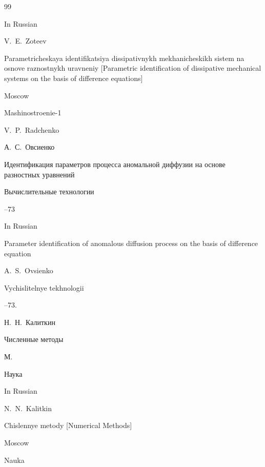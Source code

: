 \begin{thebibliography}{99}

\misctransl

\lang In Russian

\by V.~E.~Zoteev

\book Parametricheskaya identifikatsiya dissipativnykh mekhani\-cheskikh sistem na osnove raznostnykh uravneniy \rm [Parametric identification of dissipative mechanical systems on the basis of difference equations]

\publaddr Moscow

\publ Mashinostroenie-1


\ed V.~P.~Radchenko







\by А.~С.~Овсиенко

\paper Идентификация параметров процесса аномальной диффузии на основе разностных уравнений

\jour Вычислительные технологии




--73


\misctransl

\lang In Russian

\paper Parameter identification of anomalous diffusion process on the basis of difference equation

\by A.~S.~Ovsienko

\jour Vychislitelnye tekhnologii




--73.






\by Н.~Н.~Калиткин

\book Численные методы

\publaddr М.

\publ Наука



\misctransl

\lang In Russian

\by N.~N.~Kalitkin

\book Chislennye metody \rm [Numerical Methods]

\publaddr Moscow

\publ Nauka







\end{thebibliography}





